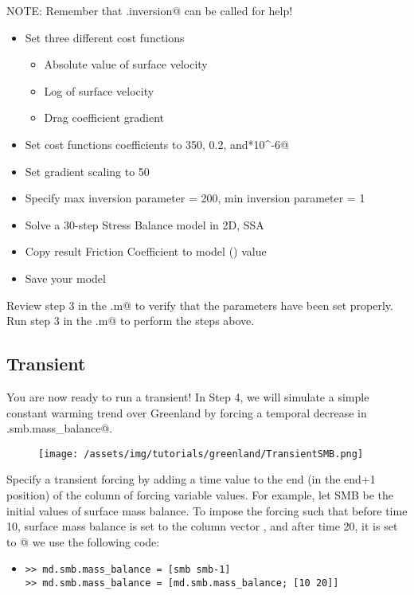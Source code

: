 NOTE: Remember that \verb@md.inversion@ can be called for help!
\begin{itemize}
	\item Set three different cost functions
		\begin{itemize}
			\item Absolute value of surface velocity
			\item Log of surface velocity
			\item Drag coefficient gradient
		\end{itemize}
	\item Set cost functions coefficients to 350, 0.2, and*10^-6@
	\item Set gradient scaling to 50
	\item Specify max inversion parameter = 200, min inversion parameter = 1
	\item Solve a 30-step Stress Balance model in 2D, SSA
	\item Copy result Friction Coefficient to model (\verb@md@) value
	\item Save your model
\end{itemize}

Review step 3 in the \verb@runme.m@ to verify that the parameters have been set properly. Run step 3 in the \verb@runme.m@ to perform the steps above.
\subsection{Transient} %
You are now ready to run a transient! In Step 4, we will simulate a simple constant warming trend over Greenland by forcing a temporal decrease in \verb@md.smb.mass_balance@.

\begin{figure}[H]
	\begin{center}
		\texttt{[image: /assets/img/tutorials/greenland/TransientSMB.png]}
	\end{center}
\end{figure}

Specify a transient forcing by adding a time value to the end (in the end+1 position) of the column of forcing variable values. For example, let SMB be the initial values of surface mass balance. To impose the forcing such that before time 10, surface mass balance is set to the column vector \verb@smb@, and after time 20, it is set to @ we use the following code:
\begin{itemize}
	\item \begin{verbatim}>> md.smb.mass_balance = [smb smb-1]
>> md.smb.mass_balance = [md.smb.mass_balance; [10 20]]\end{verbatim}
\end{itemize}


